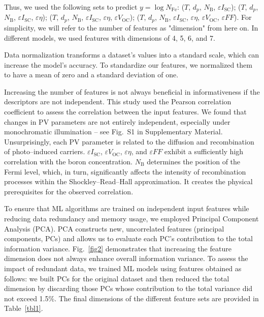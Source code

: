 \documentclass[a4paper,fleqn]{cas-sc}
\begin{document}
Thus, we used the following sets to predict $y = \log N_\mathrm{Fe}$:
($T$, $d_p$, $N_\mathrm{B}$, $\varepsilon I_\mathrm{SC}$);
($T$, $d_p$, $N_\mathrm{B}$, $\varepsilon I_\mathrm{SC}$, $\varepsilon \eta$);
($T$, $d_p$, $N_\mathrm{B}$, $\varepsilon I_\mathrm{SC}$, $\varepsilon \eta$, $\varepsilon V_\mathrm{OC}$);
($T$, $d_p$, $N_\mathrm{B}$, $\varepsilon I_\mathrm{SC}$, $\varepsilon \eta$, $\varepsilon V_\mathrm{OC}$, $\varepsilon F\!F$). For simplicity, we will refer to the number of features as "dimension" from here on. 
In different models, we used features with dimensions of 4, 5, 6, and 7.


Data normalization transforms a dataset's values into a standard scale, which can increase the model's accuracy. 
To standardize our features, we normalized them to have a mean of zero and a standard deviation of one.


Increasing the number of features is not always beneficial in informativeness if the descriptors are not independent. 
This study used the Pearson correlation coefficient to assess the correlation between the input features. 
We found that changes in PV parameters are not entirely independent, especially under monochromatic illumination – see Fig.~S1  in Supplementary Material. 
Unsurprisingly, each PV parameter is related to the diffusion and recombination of photo--induced carriers. $\varepsilon I_\mathrm{SC}$, $\varepsilon V_\mathrm{OC}$, $\varepsilon \eta$, and $\varepsilon F\!F$ exhibit a sufficiently high correlation with the boron concentration. 
$N_\mathrm{B}$ determines the position of the Fermi level, which, in turn, significantly affects the intensity of recombination processes within the Shockley--Read--Hall approximation. 
It creates the physical prerequisites for the observed correlation.


To ensure that ML algorithms are trained on independent input features while reducing data redundancy and memory usage, we employed Principal Component Analysis (PCA). 
PCA constructs new, uncorrelated features (principal components, PCs) and allows us to evaluate each PC's contribution to the total information variance. 
Fig.~\ref{fig2} demonstrates that increasing the feature dimension does not always enhance overall information variance. 
To assess the impact of redundant data, we trained ML models using features obtained as follows: we built PCs for the original dataset and then reduced the total dimension by discarding those PCs whose contribution to the total variance did not exceed 1.5\%. 
The final dimensions of the different feature sets are provided in Table~\ref{tbl1}.
\end{document}
